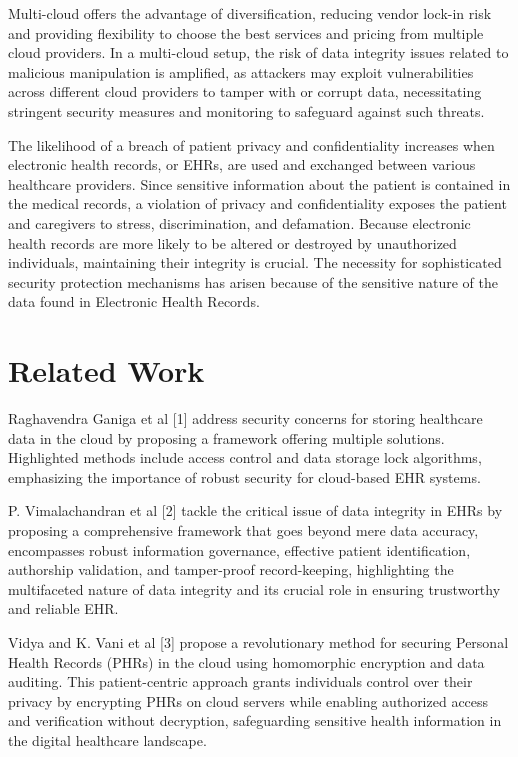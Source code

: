 \documentclass[runningheads]{llncs}
\begin{document}
Multi-cloud offers the advantage of diversification, reducing vendor lock-in risk and providing flexibility to choose the best services and pricing from multiple cloud providers. In a multi-cloud setup, the risk of data integrity issues related to malicious manipulation is amplified, as attackers may exploit vulnerabilities across different cloud providers to tamper with or corrupt data, necessitating stringent security measures and monitoring to safeguard against such threats. 

The likelihood of a breach of patient privacy and confidentiality increases when electronic health records, or EHRs, are used and exchanged between various healthcare providers. Since sensitive information about the patient is contained in the medical records, a violation of privacy and confidentiality exposes the patient and caregivers to stress, discrimination, and defamation.  Because electronic health records are more likely to be altered or destroyed by unauthorized individuals, maintaining their integrity is crucial. The necessity for sophisticated security protection mechanisms has arisen because of the sensitive nature of the data found in Electronic Health Records. 

\section{Related Work}

Raghavendra Ganiga et al [1] address security concerns for storing healthcare data in the cloud by proposing a framework offering multiple solutions. Highlighted methods include access control and data storage lock algorithms, emphasizing the importance of robust security for cloud-based EHR systems.

P. Vimalachandran et al [2] tackle the critical issue of data integrity in EHRs by proposing a comprehensive framework that goes beyond mere data accuracy, encompasses robust information governance, effective patient identification, authorship validation, and tamper-proof record-keeping, highlighting the multifaceted nature of data integrity and its crucial role in ensuring trustworthy and reliable EHR. 

Vidya and K. Vani et al [3] propose a revolutionary method for securing Personal Health Records (PHRs) in the cloud using homomorphic encryption and data auditing. This patient-centric approach grants individuals control over their privacy by encrypting PHRs on cloud servers while enabling authorized access and verification without decryption, safeguarding sensitive health information in the digital healthcare landscape.  
\end{document}
